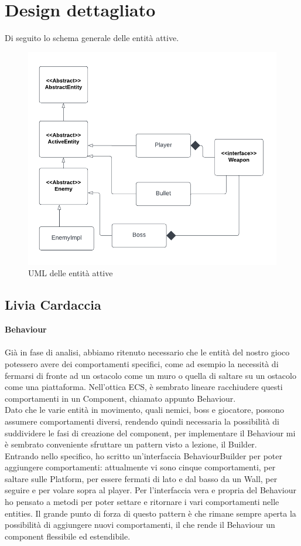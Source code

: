 \documentclass[a4paper,12pt]{report}
\begin{document}
\newpage
\section{Design dettagliato}
Di seguito lo schema generale delle entità attive.
\begin{figure}[ht]
\includegraphics[width=1\textwidth]{umlAttive.png}
\caption{UML delle entità attive}
\label{fig:schgen}
\end{figure}
\subsection{Livia Cardaccia}
\textbf{Behaviour}\\
\\
Già in fase di analisi, abbiamo ritenuto necessario che le entità del nostro gioco potessero avere dei comportamenti specifici, come ad esempio la necessità di fermarsi di fronte ad un ostacolo come un muro o quella di saltare su un ostacolo come una piattaforma.
Nell'ottica ECS, è sembrato lineare racchiudere questi comportamenti in un Component, chiamato appunto Behaviour.\\ Dato che le varie entità in movimento, quali nemici, boss e giocatore, possono assumere comportamenti diversi, rendendo quindi necessaria la possibilità di suddividere le fasi di creazione del component, per implementare il Behaviour mi è sembrato conveniente sfruttare un pattern visto a lezione, il Builder.\\ Entrando nello specifico, ho scritto un'interfaccia BehaviourBuilder per poter aggiungere comportamenti: attualmente vi sono cinque comportamenti, per saltare sulle Platform, per essere fermati di lato e dal basso da un Wall, per seguire e per volare sopra al player. Per l'interfaccia vera e propria del Behaviour ho pensato a metodi per poter settare e ritornare i vari comportamenti nelle entities. Il grande punto di forza di questo pattern è che rimane sempre aperta la possibilità di aggiungere nuovi comportamenti, il che rende il Behaviour un component flessibile ed estendibile.
\end{document}
